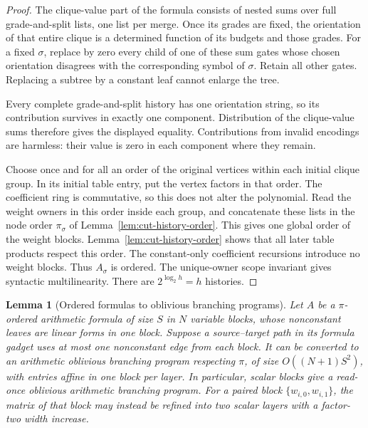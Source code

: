 \documentclass[11pt]{article}
\newtheorem{lemma}[theorem]{Lemma}
\theoremstyle{definition}
\theoremstyle{remark}
\begin{document}
\begin{proof}
The clique-value part of the formula consists of nested sums over full
grade-and-split lists, one list per merge. Once its grades are fixed,
the orientation of that entire clique is a determined function of its
budgets and those grades. For a fixed $\sigma$, replace by zero every
child of one of these sum gates whose chosen orientation disagrees
with the corresponding symbol of $\sigma$. Retain all other gates.
Replacing a subtree by a constant leaf cannot enlarge the tree.

Every complete grade-and-split history has one orientation string, so
its contribution survives in exactly one component. Distribution of
the clique-value sums therefore gives the displayed equality.
Contributions from invalid encodings are harmless: their value is
zero in each component where they remain.

Choose once and for all an order of the original vertices within each
initial clique group. In its initial table entry, put the vertex
factors in that order. The coefficient ring is commutative, so this
does not alter the polynomial. Read the weight owners in this order
inside each group, and concatenate these lists in the node order
$\pi_\sigma$ of Lemma~\ref{lem:cut-history-order}. This gives one
global order of the weight blocks. Lemma~\ref{lem:cut-history-order}
shows that all later table products respect this order. The constant-only coefficient
recursions introduce no weight blocks. Thus $A_\sigma$ is ordered.
The unique-owner scope invariant gives syntactic multilinearity.
There are $2^{\log_2h}=h$ histories.
\end{proof}

\begin{lemma}[Ordered formulas to oblivious branching programs]
\label{lem:ordered-formula-roabp}
Let $A$ be a $\pi$-ordered arithmetic formula of size $S$ in $N$
variable blocks, whose nonconstant leaves are linear forms in one
block. Suppose a source--target path in its formula gadget uses at
most one nonconstant edge from each block. It can be converted to an
arithmetic oblivious branching program respecting $\pi$, of size
$O((N+1)S^2)$, with entries affine in one block per layer. In particular,
scalar blocks give a read-once oblivious arithmetic branching program.
For a paired block $\{w_{i,0},w_{i,1}\}$, the matrix of that block
may instead be refined into two scalar layers with a factor-two width
increase.
\end{lemma}
\end{document}

